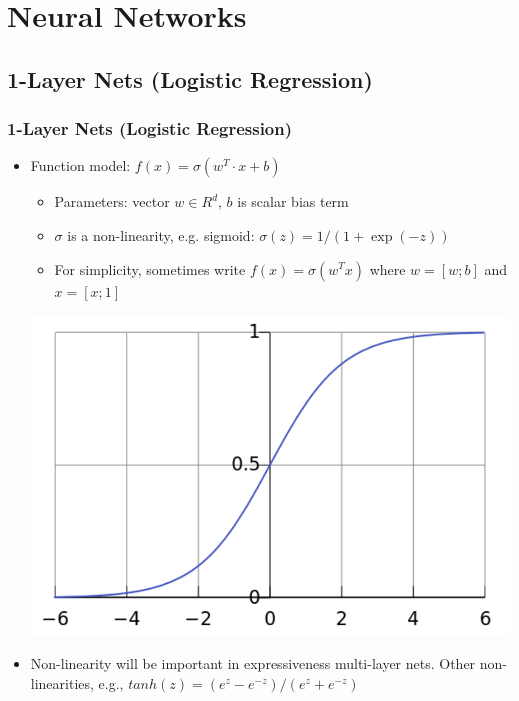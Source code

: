 \documentclass{beamer}
\newcommand{\bi}{\begin{itemize}}
\newcommand{\ei}{\end{itemize}}
\begin{document}
\section{Neural Networks}


\subsection[1-Layer Nets]{1-Layer Nets (Logistic Regression)}

\begin{frame}
\frametitle{1-Layer Nets (Logistic Regression)}
\bi
\item Function model: $f(x)=\sigma(w^T \cdot x + b)$
	\bi
	\item Parameters: vector $w \in R^d$, $b$ is scalar bias term
	\item $\sigma$ is a non-linearity, e.g. sigmoid: $\sigma(z) = 1/(1+\exp(-z))$
	\item For simplicity, sometimes write $f(x)=\sigma(w^T x)$ where $w=[w;b]$ and $x=[x;1]$
	\ei
\centerline{\includegraphics[scale=0.3]{figs/sigmoid}}
\pause
\item Non-linearity will be important in expressiveness multi-layer nets. Other non-linearities, e.g., $tanh(z)=(e^z-e^{-z}) / (e^z+e^{-z})$
\ei
\end{frame}
\end{document}

